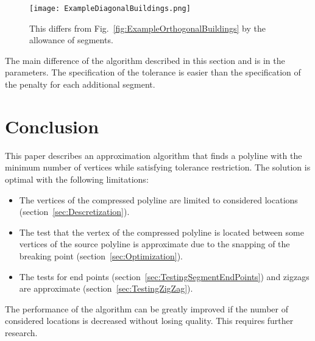 \documentclass[conference]{IEEEtran}
\begin{document}
\begin{figure} [htb]
  \centering
    \texttt{[image: ExampleDiagonalBuildings.png]}
  \caption
  {
    This differs from Fig.~\ref{fig:ExampleOrthogonalBuildings} by the allowance of  segments.
  }
  \label{fig:Example45DegreeBuildings}
\end{figure}

The main difference of the algorithm described in this section and \cite{ReconstructionOfOrthogonalPolygonalLines} is in the parameters. The specification of the tolerance is easier than the specification of the penalty  for each additional segment.

\section{Conclusion}

This paper describes an approximation algorithm that finds a polyline with the minimum number of vertices while satisfying tolerance restriction. The solution is optimal with the following limitations:
\begin{itemize}
  \item The vertices of the compressed polyline are limited to considered locations (section~\ref{sec:Descretization}).
  \item The test that the vertex of the compressed polyline is located between some vertices of the source polyline is approximate due to the snapping of the breaking point (section~\ref{sec:Optimization}).
  \item The tests for end points (section~\ref{sec:TestingSegmentEndPoints}) and zigzags are approximate (section~\ref{sec:TestingZigZag}).
\end{itemize}

The performance of the algorithm can be greatly improved if the number of considered locations is decreased without losing quality. This requires further research.

\newcommand{\doi}[1]{\textsc{doi}: \href{http://dx.doi.org/#1}{\nolinkurl{#1}}}



\begingroup
\raggedright


\endgroup
\end{document}
